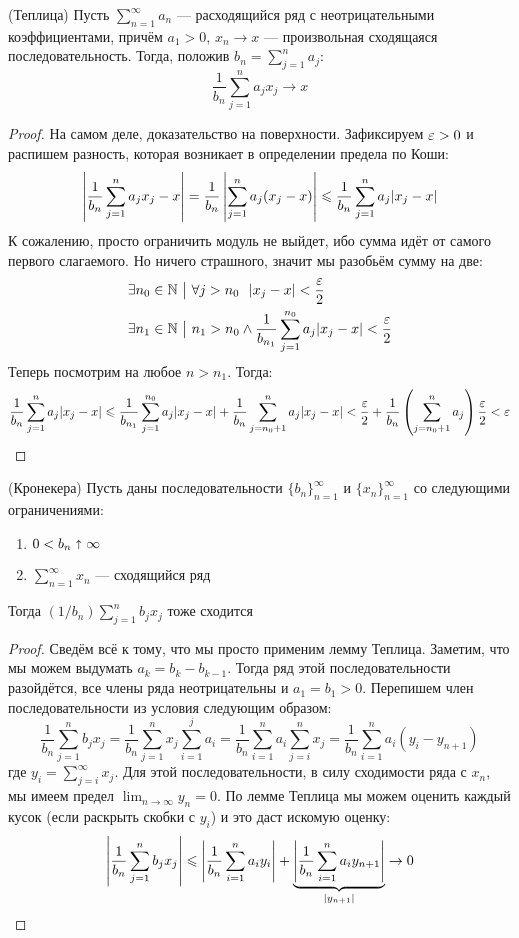 \begin{lemma} (Теплица)
	Пусть $\sum_{n = 1}^\infty a_n$ --- расходящийся ряд с неотрицательными коэффициентами, причём $a_1 > 0$, $x_n \to x$ --- произвольная сходящаяся последовательность. Тогда, положив $b_n = \sum_{j = 1}^n a_j$:
	\[
		\frac{1}{b_n} \sum_{j = 1}^n a_jx_j \to x
	\]
\end{lemma}

\begin{proof}
	На самом деле, доказательство на поверхности. Зафиксируем $\varepsilon > 0$ и распишем разность, которая возникает в определении предела по Коши:
	\[
		\left|\frac{1}{b_n} \sum_{j = 1}^n a_jx_j - x\right| = \frac{1}{b_n} \left|\sum_{j = 1}^n a_j(x_j - x)\right| \leqslant \frac{1}{b_n} \sum_{j = 1}^n a_j|x_j - x|
	\]
	К сожалению, просто ограничить модуль не выйдет, ибо сумма идёт от самого первого слагаемого. Но ничего страшного, значит мы разобьём сумму на две:
	\begin{align*}
		&{\exists n_0 \in \mathbb{N} \ \big|\  \forall j > n_0\ \ |x_j - x| < \frac{\varepsilon}{2}}
		\\
		&{\exists n_1 \in \mathbb{N} \ \big|\  n_1 > n_0 \wedge \frac{1}{b_{n_1}} \sum_{j = 1}^{n_0} a_j|x_j - x|} < \frac{\varepsilon}{2}
	\end{align*}
	Теперь посмотрим на любое $n > n_1$. Тогда:
	\[
		\frac{1}{b_n} \sum_{j = 1}^n a_j|x_j - x| \leqslant \frac{1}{b_{n_1}}\sum_{j = 1}^{n_0} a_j|x_j - x| + \frac{1}{b_n} \sum_{j = n_0 + 1}^n a_j|x_j - x| < \frac{\varepsilon}{2} + \frac{1}{b_n}\left(\sum_{j = n_0 + 1}^n a_j\right) \frac{\varepsilon}{2} < \varepsilon
	\]
\end{proof}

\begin{lemma} (Кронекера)
	Пусть даны последовательности $\{b_n\}_{n = 1}^\infty$ и $\{x_n\}_{n = 1}^\infty$ со следующими ограничениями:
	\begin{enumerate}
		\item $0 < b_n \shortuparrow \infty$
		
		\item $\sum_{n = 1}^\infty x_n$ --- сходящийся ряд
	\end{enumerate}
	Тогда $(1 / b_n)\sum_{j = 1}^n b_jx_j$ тоже сходится
\end{lemma}

\begin{proof}
	Сведём всё к тому, что мы просто применим лемму Теплица. Заметим, что мы можем выдумать $a_k = b_k - b_{k - 1}$. Тогда ряд этой последовательности разойдётся, все члены ряда неотрицательны и $a_1 = b_1 > 0$. Перепишем член последовательности из условия следующим образом:
	\[
		\frac{1}{b_n} \sum_{j = 1}^n b_jx_j = \frac{1}{b_n} \sum_{j = 1}^n x_j \sum_{i = 1}^j a_i = \frac{1}{b_n} \sum_{i = 1}^n a_i \sum_{j = i}^n x_j = \frac{1}{b_n} \sum_{i = 1}^n a_i(y_i - y_{n + 1})
	\]
	где $y_i = \sum_{j = i}^\infty x_j$. Для этой последовательности, в силу сходимости ряда с $x_n$, мы имеем предел $\lim_{n \to \infty} y_n = 0$. По лемме Теплица мы можем оценить каждый кусок (если раскрыть скобки с $y_i$) и это даст искомую оценку:
	\[
		\left|\frac{1}{b_n} \sum_{j = 1}^n b_jx_j\right| \leqslant \left|\frac{1}{b_n} \sum_{i = 1}^n a_i y_i\right| + \underbrace{\left|\frac{1}{b_n} \sum_{i = 1}^n a_i y_{n + 1}\right|}_{|y_{n + 1}|} \to 0
	\]
\end{proof}

